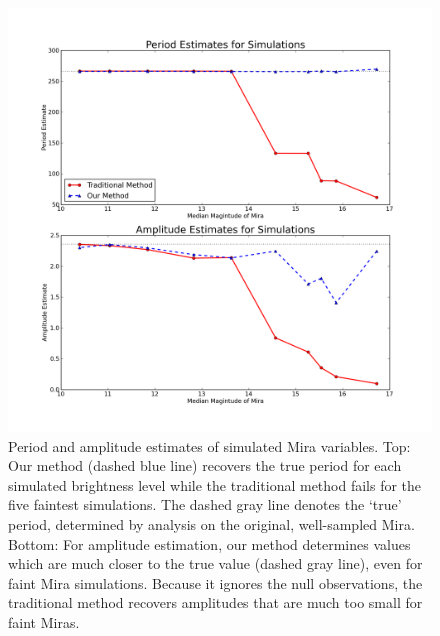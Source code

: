 \documentclass[12pt,preprint]{aastex}
\begin{document}
\clearpage
\begin{figure}
\begin{center}
\includegraphics[angle=0,width=6.5in]{simulation_parameter_estimates.png}
\end{center}
\caption{  Period and amplitude estimates of simulated Mira variables.  Top: Our method (dashed blue line) recovers the true period for each simulated brightness level while the traditional method fails for the five faintest simulations.  The dashed gray line denotes the `true' period, determined by analysis on the original, well-sampled Mira.  Bottom: For amplitude estimation, our method determines values which are much closer to the true value (dashed gray line), even for faint Mira simulations.  Because it ignores the null observations, the traditional method recovers  amplitudes that are much too small for faint Miras.    \label{fig:mirasimparams}}
\end{figure}
\end{document}
